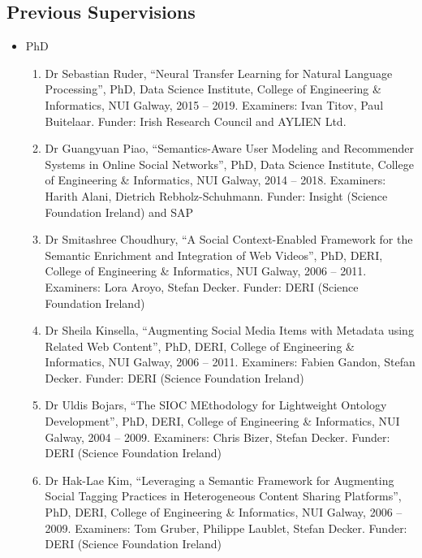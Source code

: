 \documentclass[10pt,a4paper]{res} %
\begin{document}
\begin{resume}


\subsection*{Previous Supervisions}

\begin{itemize} \itemsep -2pt
\item PhD
\begin{enumerate} \itemsep -2pt
\item Dr Sebastian Ruder, ``Neural Transfer Learning for Natural Language Processing'', PhD, Data Science Institute, College of Engineering \& Informatics, NUI Galway, 2015 -- 2019. Examiners: Ivan Titov, Paul Buitelaar. Funder: Irish Research Council and AYLIEN Ltd. %
\item Dr Guangyuan Piao, ``Semantics-Aware User Modeling and Recommender Systems in Online Social Networks'', PhD, Data Science Institute, College of Engineering \& Informatics, NUI Galway, 2014 -- 2018. Examiners: Harith Alani, Dietrich Rebholz-Schuhmann. Funder: Insight (Science Foundation Ireland) and SAP %
\item Dr Smitashree Choudhury, ``A Social Context-Enabled Framework for the Semantic Enrichment and Integration of Web Videos'', PhD, DERI, College of Engineering \& Informatics, NUI Galway, 2006 -- 2011. Examiners: Lora Aroyo, Stefan Decker. Funder: DERI (Science Foundation Ireland) %
\item Dr Sheila Kinsella, ``Augmenting Social Media Items with Metadata using Related Web Content'', PhD, DERI, College of Engineering \& Informatics, NUI Galway, 2006 -- 2011. Examiners: Fabien Gandon, Stefan Decker. Funder: DERI (Science Foundation Ireland) %
\item Dr Uldis Bojars, ``The SIOC MEthodology for Lightweight Ontology Development'', PhD, DERI, College of Engineering \& Informatics, NUI Galway, 2004 -- 2009. Examiners: Chris Bizer, Stefan Decker. Funder: DERI (Science Foundation Ireland) %
\item Dr Hak-Lae Kim, ``Leveraging a Semantic Framework for Augmenting Social Tagging Practices in Heterogeneous Content Sharing Platforms'', PhD, DERI, College of Engineering \& Informatics, NUI Galway, 2006 -- 2009. Examiners: Tom Gruber, Philippe Laublet, Stefan Decker. Funder: DERI (Science Foundation Ireland) %

\end{enumerate}
\end{itemize}
\end{resume}
\end{document}
